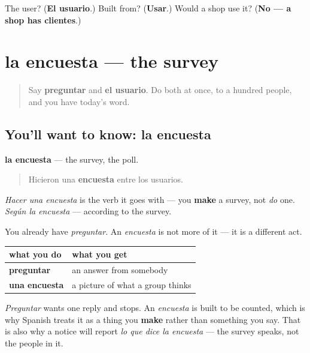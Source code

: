 \begin{tcolorbox}[breakable,colback=teal!4,colframe=teal!35!black,title={Before you move on}]
The user? (\textbf{El usuario}.) Built from? (\textbf{Usar}.) Would a shop use it? (\textbf{No — a shop has clientes}.)
\end{tcolorbox}
\section[la encuesta]{la encuesta — the survey}

\label{lesson:ES-C472-encuesta}



\begin{quote}
Say \textbf{preguntar} and \textbf{el usuario}. Do both at once, to a hundred people, and you have today's word.
\end{quote}

\subsection*{You'll want to know: la encuesta}
\textbf{la encuesta} — the survey, the poll.

\begin{quote}
Hicieron una \textbf{encuesta} entre los usuarios.
\end{quote}

\emph{Hacer una encuesta} is the verb it goes with — you \textbf{make} a survey, not \emph{do} one. \emph{Según la encuesta} — according to the survey.

\begin{grammarlens}[title={Grammar Lens: asking one person and asking a population}]
You already have \emph{preguntar}. An \emph{encuesta} is not more of it — it is a different act.

\noindent
\begin{tabularx}{\linewidth}{@{}>{\raggedright\arraybackslash}X>{\raggedright\arraybackslash}X@{}}
\toprule
\textbf{what you do} & \textbf{what you get} \\
\midrule
\textbf{preguntar} & an answer from somebody \\
\textbf{una encuesta} & a picture of what a group thinks \\
\bottomrule
\end{tabularx}

\emph{Preguntar} wants one reply and stops. An \emph{encuesta} is built to be counted, which is why Spanish treats it as a thing you \textbf{make} rather than something you say. That is also why a notice will report \emph{lo que dice la encuesta} — the survey speaks, not the people in it.
\end{grammarlens}

